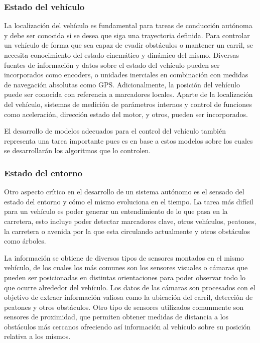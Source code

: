         \subsubsection{Estado del vehículo}
        La localización del vehículo es fundamental para tareas de conducción autónoma y debe ser conocida si se desea que siga 
        una trayectoria definida. Para controlar un vehículo de forma que sea capaz de evadir obstáculos o mantener un carril, se 
        necesita conocimiento del estado cinemático y dinámico del mismo. Diversas fuentes de información y datos sobre el estado
        del vehículo pueden ser incorporados como encoders, o unidades inerciales en combinación con medidas de navegación absolutas 
        como GPS. Adicionalmente, la posición del vehículo puede ser conocida con referencia a marcadores locales. Aparte de la 
        localización del vehículo, sistemas de medición de parámetros internos y control de funciones como aceleración, dirección 
        estado del motor, y otros, pueden ser incorporados.

        El desarrollo de modelos adecuados para el control del vehículo también representa una tarea importante pues es en 
        base a estos modelos sobre los cuales se desarrollarán los algoritmos que lo controlen. 

        \subsubsection{Estado del entorno}
        Otro aspecto crítico en el desarrollo de un sistema autónomo es el sensado del estado del entorno y cómo el mismo 
        evoluciona en el tiempo. La tarea más difícil para un vehículo es poder generar un entendimiento de lo que pasa en 
        la carretera, esto incluye poder detectar marcadores clave, otros vehículos, peatones, la carretera o avenida por la que 
        esta circulando actualmente y otros obstáculos como árboles. 
        
        La información se obtiene de diversos tipos de sensores 
        montados en el mismo vehículo, de los cuales los más comunes son los sensores visuales o cámaras que pueden ser posicionadas 
        en distintas orientaciones para poder observar todo lo que ocurre alrededor del vehículo. Los datos de las cámaras 
        son procesados con el objetivo de extraer información valiosa como la ubicación del carril, detección de peatones y otros 
        obstáculos. Otro tipo de sensores utilizados comunmente son sensores de proximidad, que permiten obtener medidas de distancia 
        a los obstáculos más cercanos ofreciendo así información al vehículo sobre su posición relativa a los mismos. 
        
